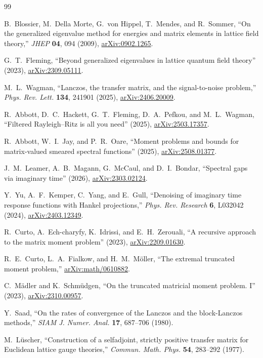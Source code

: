 \documentclass[11pt]{article}
\theoremstyle{definition}
\theoremstyle{remark}
\begin{document}
\begin{thebibliography}{99}

B.~Blossier, M.~Della Morte, G.~von Hippel, T.~Mendes, and R.~Sommer,
``On the generalized eigenvalue method for energies and matrix elements in
lattice field theory,'' \emph{JHEP} \textbf{04}, 094 (2009),
\href{https://arxiv.org/abs/0902.1265}{arXiv:0902.1265}.

G.~T.~Fleming, ``Beyond generalized eigenvalues in lattice quantum field
theory'' (2023),
\href{https://arxiv.org/abs/2309.05111}{arXiv:2309.05111}.

M.~L.~Wagman, ``Lanczos, the transfer matrix, and the signal-to-noise
problem,'' \emph{Phys. Rev. Lett.} \textbf{134}, 241901 (2025),
\href{https://arxiv.org/abs/2406.20009}{arXiv:2406.20009}.

R.~Abbott, D.~C.~Hackett, G.~T.~Fleming, D.~A.~Pefkou, and M.~L.~Wagman,
``Filtered Rayleigh--Ritz is all you need'' (2025),
\href{https://arxiv.org/abs/2503.17357}{arXiv:2503.17357}.

R.~Abbott, W.~I.~Jay, and P.~R.~Oare,
``Moment problems and bounds for matrix-valued smeared spectral functions''
(2025), \href{https://arxiv.org/abs/2508.01377}{arXiv:2508.01377}.

J.~M.~Leamer, A.~B.~Magann, G.~McCaul, and D.~I.~Bondar,
``Spectral gaps via imaginary time'' (2026),
\href{https://arxiv.org/abs/2303.02124}{arXiv:2303.02124}.

Y.~Yu, A.~F.~Kemper, C.~Yang, and E.~Gull,
``Denoising of imaginary time response functions with Hankel projections,''
\emph{Phys. Rev. Research} \textbf{6}, L032042 (2024),
\href{https://arxiv.org/abs/2403.12349}{arXiv:2403.12349}.

R.~Curto, A.~Ech-charyfy, K.~Idrissi, and E.~H.~Zerouali,
``A recursive approach to the matrix moment problem'' (2023),
\href{https://arxiv.org/abs/2209.01630}{arXiv:2209.01630}.

R.~E.~Curto, L.~A.~Fialkow, and H.~M.~M\"oller,
``The extremal truncated moment problem,''
\href{https://arxiv.org/abs/math/0610882}{arXiv:math/0610882}.

C.~M\"adler and K.~Schm\"udgen,
``On the truncated matricial moment problem. I'' (2023),
\href{https://arxiv.org/abs/2310.00957}{arXiv:2310.00957}.

Y.~Saad, ``On the rates of convergence of the Lanczos and the block-Lanczos
methods,'' \emph{SIAM J. Numer. Anal.} \textbf{17}, 687--706 (1980).

M.~L\"uscher, ``Construction of a selfadjoint, strictly positive transfer
matrix for Euclidean lattice gauge theories,'' \emph{Commun. Math. Phys.}
\textbf{54}, 283--292 (1977).

\end{thebibliography}
\end{document}
